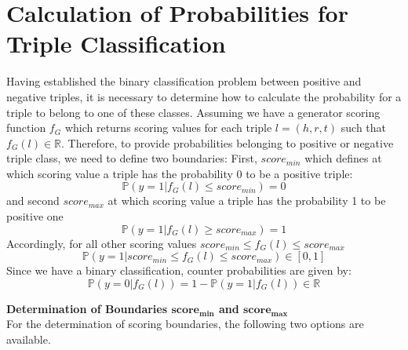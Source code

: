 \section{Calculation of Probabilities for Triple Classification} \label{sec:calculation_of_probabilities_for_triple_classification}
%
Having established the binary classification problem between positive and negative triples, it is necessary to determine how to calculate the probability for a triple to belong to one of these classes.
Assuming we have a generator scoring function $f_G$ which returns scoring values for each triple $l = (h,r,t)$ such that $f_G(l) \in \mathbb{R}$.
Therefore, to provide probabilities belonging to positive or negative triple class, we need to define two boundaries:
First, $score_{min}$ which defines at which scoring value a triple has the probability 0 to be a positive triple: 
\begin{equation} \label{eqn:prob_score_min}
    \mathds{P}(y = 1 | f_G(l) \leq score_{min}) = 0
\end{equation}
and second $score_{max}$ at which scoring value a triple has the probability 1 to be positive one 
\begin{equation} \label{eqn:prob_score_max}
    \mathds{P}(y = 1 | f_G(l) \geq score_{max}) = 1
\end{equation}
Accordingly, for all other scoring values $score_{min} \leq f_G(l) \leq score_{max}$
\begin{equation} \label{eqn:prob_score_all}
    \mathds{P}(y = 1 | score_{min} \leq f_G(l) \leq score_{max}) \in [0, 1]
\end{equation}
Since we have a binary classification, counter probabilities are given by:
\begin{equation} \label{eqn:counter_prob}
    \mathds{P}(y = 0 | f_G(l)) = 1 - \mathds{P}(y = 1 | f_G(l)) \in \mathbb{R}
\end{equation}

\textbf{Determination of Boundaries $\textbf{score}_{\textbf{min}}$ and $\textbf{score}_{\textbf{max}}$}\\
For the determination of scoring boundaries, the following two options are available.

